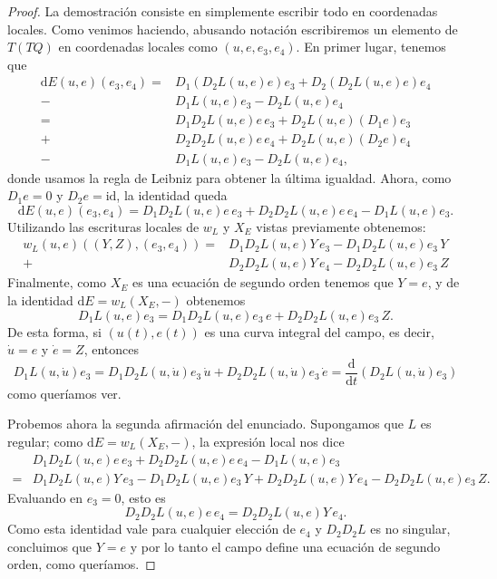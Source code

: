 \documentclass[11pt, a4paper]{article}
\newcommand{\id}{\mathrm{id}}
\newcommand{\dd}{\mathrm{d}}
\newcommand{\ddt}{\frac{\dd}{\dd t}}
\theoremstyle{plain}
\theoremstyle{definition}
\begin{document}
\begin{proof} La demostración consiste en simplemente escribir todo en coordenadas locales. Como venimos haciendo, abusando notación escribiremos un elemento de $T(TQ)$ en coordenadas locales como $(u,e,e_3,e_4)$.
En primer lugar, tenemos que
\begin{align*}
\dd E(u,e)(e_3,e_4) =& D_1(D_2L(u,e)e)e_3 + D_2(D_2L(u,e)e)e_4\\
-&D_1L(u,e)e_3 - D_2 L(u,e)e_4\\
=&  D_1D_2L(u,e)e\, e_3 + D_2L(u,e)(D_1e)e_3\\
+&  D_2D_2L(u,e)e\,e_4 + D_2L(u,e)(D_2e)e_4\\
-&D_1L(u,e)e_3 - D_2 L(u,e)e_4,
\end{align*}
donde usamos la regla de Leibniz para obtener la última igualdad. Ahora, como $D_1e=0$ y $D_2 e= \id$, la identidad queda
\[\dd E(u,e)(e_3,e_4) =  D_1D_2L(u,e)e\, e_3 
+  D_2D_2L(u,e)e\,e_4 
-D_1L(u,e)e_3. \]
Utilizando las escrituras locales de $w_L$ y $X_E$ vistas previamente obtenemos:
\begin{align*}
w_L(u,e)((Y,Z),(e_3,e_4))=& D_1D_2L(u,e)Y\, e_3 - D_1D_2L(u,e)e_3\,Y\\
+& D_2D_2L(u,e)Y\, e_4 - D_2D_2L(u,e)e_3\,Z
\end{align*}
Finalmente, como $X_E$ es una ecuación de segundo orden tenemos que $Y=e$, y de la identidad $\dd E = w_L(X_E ,-)$ obtenemos
\[D_1L(u,e)e_3 = D_1 D_2L(u,e)e_3\,e + D_2D_2L(u,e)e_3\, Z.\]
De esta forma, si $(u(t), e(t))$ es una curva integral del campo, es decir, $\dot{u}=e$ y $\dot{e}=Z$, entonces
\[D_1L(u,\dot{u})e_3 = D_1D_2L(u,\dot{u})e_3\, \dot{u}+D_2D_2L(u,\dot{u})e_3\, \dot{e} = \ddt \left( D_2L(u,\dot{u})e_3\right)\]
como queríamos ver.

Probemos ahora la segunda afirmación del enunciado. Supongamos que $L$ es regular; como $\dd E = w_L(X_E,-)$, la expresión local nos dice
\begin{align*}
& D_1D_2L(u,e)e\, e_3  +  D_2D_2L(u,e)e\,e_4  -D_1L(u,e)e_3\\
=& D_1D_2L(u,e)Y\, e_3 - D_1D_2L(u,e)e_3\,Y
+ D_2D_2L(u,e)Y\, e_4 - D_2D_2L(u,e)e_3\,Z.
\end{align*}
Evaluando en $e_3=0$, esto es
\[D_2D_2 L(u,e)e\, e_4=D_2D_2L(u,e)Y\, e_4.\]
Como esta identidad vale para cualquier elección de $e_4$ y $D_2D_2 L$ es no singular, concluimos que $Y=e$ y por lo tanto el campo define una ecuación de segundo orden, como queríamos.
\end{proof}
\end{document}
